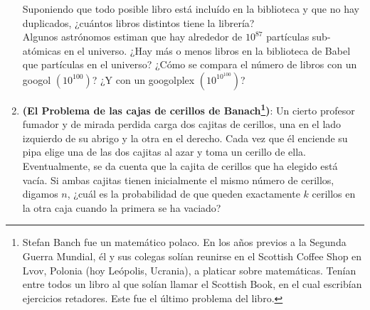 \documentclass{article}
\begin{document}
\begin{enumerate}
    Suponiendo que todo posible libro está incluído en la biblioteca y que no hay duplicados, ¿cuántos libros 
    distintos tiene la librería?\\

    Algunos astrónomos estiman que hay alrededor de $10^{87}$ partículas sub-atómicas en el universo.
    ¿Hay más o menos libros en la biblioteca de Babel que partículas en el universo? ¿Cómo se compara el número 
    de libros con un googol $\left(10^{100}\right)$? ¿Y con un googolplex $\left(10^{10^{100}}\right)$?

    \item \textbf{(El Problema de las cajas de cerillos de Banach\footnote[1]{Stefan Banch fue un matemático polaco. En los años previos a la Segunda 
    Guerra Mundial, él y sus colegas solían reunirse en el Scottish Coffee Shop en Lvov, Polonia (hoy Leópolis, Ucrania), a platicar sobre matemáticas.
    Tenían entre todos un libro al que solían llamar el Scottish Book, en el cual escribían ejercicios retadores. Este fue el último 
    problema del libro.})}: Un cierto profesor fumador y de mirada perdida 
    carga dos cajitas de cerillos, una en el lado izquierdo de su abrigo y la otra en el derecho. Cada vez 
    que él enciende su pipa elige una de las dos cajitas al azar y toma un cerillo de ella. Eventualmente, se 
    da cuenta que la cajita de cerillos que ha elegido está vacía. Si ambas cajitas tienen inicialmente el mismo número 
    de cerillos, digamos $n$, ¿cuál es la probabilidad de que queden exactamente $k$ cerillos en la otra caja 
    cuando la primera se ha vaciado?

\end{enumerate}
\end{document}
